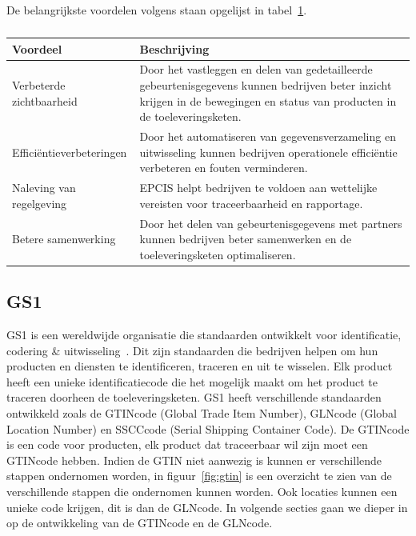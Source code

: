De belangrijkste voordelen volgens \textcite{GS12025} staan opgelijst in tabel~\ref{tab:epcis-voordelen}.
\begin{table}[H]
    \centering
     \begin{tabular}{lp{}}
          \toprule
          \textbf{Voordeel} & \textbf{Beschrijving} \\
          \toprule
          Verbeterde zichtbaarheid & Door het vastleggen en delen van gedetailleerde gebeurtenisgegevens kunnen bedrijven beter inzicht krijgen in de bewegingen en status van producten in de toeleveringsketen. \\
          \midrule
          Efficiëntieverbeteringen & Door het automatiseren van gegevensverzameling en \-uitwisseling kunnen bedrijven operationele efficiëntie verbeteren en fouten verminderen. \\
          \midrule
          Naleving van regelgeving & EPCIS helpt bedrijven te voldoen aan wettelijke vereisten voor traceerbaarheid en rapportage. \\
          \midrule
          Betere samenwerking & Door het delen van gebeurtenisgegevens met partners kunnen bedrijven beter samenwerken en de toeleveringsketen optimaliseren. \\
          \bottomrule
     \end{tabular}
     \caption[Belangrijkste voordelen van EPCIS volgens GS1]{\label{tab:epcis-voordelen}}
\end{table}

\subsection{GS1}
GS1 is een wereldwijde organisatie die standaarden ontwikkelt voor identificatie, codering \& uitwisseling~\autocite{GS1standards}.
Dit zijn standaarden die bedrijven helpen om hun producten en diensten te identificeren, traceren en uit te wisselen.
Elk product heeft een unieke identificatiecode die het mogelijk maakt om het product te traceren doorheen de toeleveringsketen.
GS1 heeft verschillende standaarden ontwikkeld zoals de GTIN\-code (Global Trade Item Number), GLN\-code (Global Location Number) en SSCC\-code (Serial Shipping Container Code).
De GTIN\-code is een code voor producten, elk product dat traceerbaar wil zijn moet een GTIN\-code hebben. 
Indien de GTIN niet aanwezig is kunnen er verschillende stappen ondernomen worden, in figuur~\ref{fig:gtin} is een overzicht te zien van de verschillende stappen die ondernomen kunnen worden.
Ook locaties kunnen een unieke code krijgen, dit is dan de GLN\-code. In volgende secties gaan we dieper in op de ontwikkeling van de GTIN\-code en de GLN\-code.


